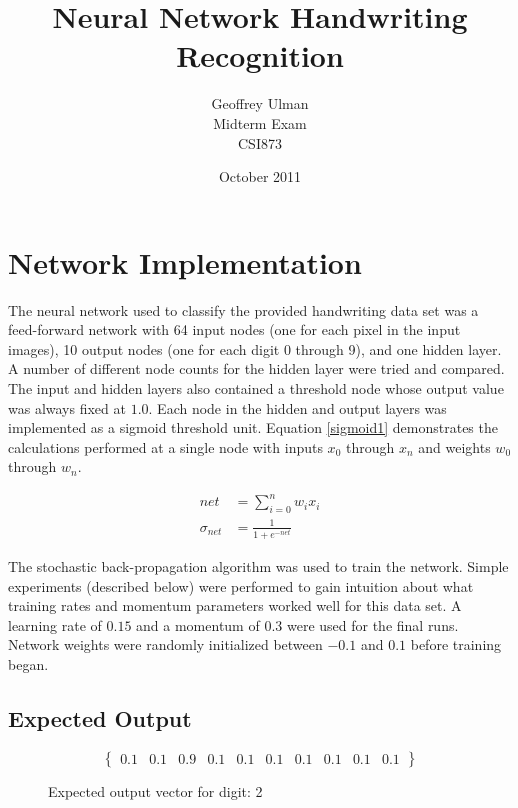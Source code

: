 \documentclass{article}
\begin{document}
\title{Neural Network Handwriting Recognition}
\author{Geoffrey Ulman\\
        Midterm Exam\\
        CSI873}
\date{October 2011}
\maketitle

\tableofcontents

\section{Network Implementation}\label{Network Parameters}

The neural network used to classify the provided handwriting data set was a feed-forward network with 64 input nodes (one for each pixel in the input images), 10 output nodes (one for each digit 0 through 9), and one hidden layer. A number of different node counts for the hidden layer were tried and compared. The input and hidden layers also contained a threshold node whose output value was always fixed at \(1.0\). Each node in the hidden and output layers was implemented as a sigmoid threshold unit. Equation \ref{sigmoid1} demonstrates the calculations performed at a single node with inputs \(x_{0}\) through \(x_{n}\) and weights \(w_{0}\) through \(w_{n}\).

\begin{equation}\label{sigmoid1}
\begin{split}
net &= \sum\limits_{i=0}^n w_{i}x_{i}\\
\sigma_{net} &= \frac{1}{1+e^{-net}}
\end{split}
\end{equation}

The stochastic back-propagation algorithm was used to train the network. Simple experiments (described below) were performed to gain intuition about what training rates and momentum parameters worked well for this data set. A learning rate of \(0.15\) and a momentum of \(0.3\) were used for the final runs. Network weights were randomly initialized between \(-0.1\) and \(0.1\) before training began.

\subsection{Expected Output}

\begin{figure}\label{expected1}
\[ \begin{Bmatrix} 0.1 & 0.1 & 0.9 & 0.1 & 0.1 & 0.1 & 0.1 & 0.1 & 0.1 & 0.1 \end{Bmatrix} \]
\caption{Expected output vector for digit: 2}
\end{figure}
\end{document}
